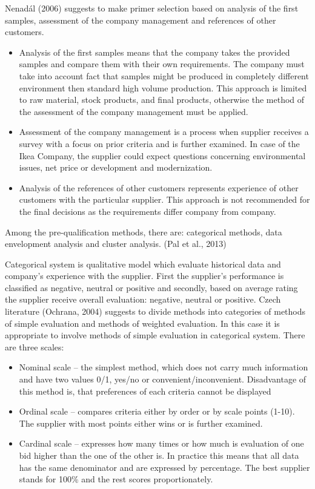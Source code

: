 \documentclass[oneside,12pt]{article}%
\begin{document}
Nenadál (2006) suggests to make primer selection based on analysis of the first samples, assessment of the company management and references of other customers.
\begin{itemize}
  \item Analysis of the first samples means that the company takes the provided samples and compare them with their own requirements. The company must take into account fact that samples might be produced in completely different environment then standard high volume production. This approach is limited to raw material, stock products, and final products, otherwise the method of the assessment of the company management must be applied.
  \item Assessment of the company management is a process when supplier receives a survey with a focus on prior criteria and is further examined. In case of the Ikea Company, the supplier could expect questions concerning environmental issues, net price or development and modernization.
  \item Analysis of the references of other customers represents experience of other customers with the particular supplier. This approach is not recommended for the final decisions as the requirements differ company from company.

\end{itemize}


Among the pre-qualification methods, there are: categorical methods, data envelopment analysis and cluster analysis. (Pal et al., 2013) \par
Categorical system is qualitative model which evaluate historical data and company’s experience with the supplier. First the supplier’s performance is classified as negative, neutral or positive and secondly, based on average rating the supplier receive overall evaluation: negative, neutral or positive. Czech literature (Ochrana, 2004) suggests to divide methods into categories of methods of simple evaluation and methods of weighted evaluation. In this case it is appropriate to involve methods of simple evaluation in categorical system. There are three scales:
\begin{itemize}
\item Nominal scale – the simplest method, which does not carry much information and have two values 0/1, yes/no or convenient/inconvenient. Disadvantage of this method is, that preferences of each criteria cannot be displayed
\item Ordinal scale – compares criteria either by order or by scale points (1-10). The supplier with most points either wins or is further examined.
\item Cardinal scale – expresses how many times or how much is evaluation of one bid higher than the one of the other is. In practice this means that all data has the same denominator and are expressed by percentage. The best supplier stands for 100\% and the rest scores proportionately.
\end{itemize}
\end{document}
